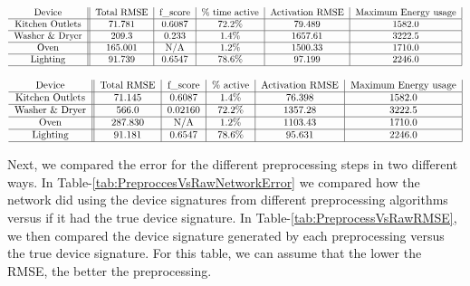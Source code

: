 \documentclass{article}
\begin{document}
\begin{table*}[t]
	\centering
	$$\begin{tabular}{c||c|c|c|c|c|}
	Device & Total RMSE & f\_score & \% time active& Activation RMSE & Maximum Energy usage \\
	\hline
	Kitchen Outlets & 71.781 & 0.6087 & 72.2\% & 79.489  & 1582.0  \\ %
	\hline
	Washer \& Dryer  & 209.3 & 0.233 & 1.4\% & 1657.61  & 3222.5 \\ %
	\hline
	Oven & 165.001 & N/A & 1.2\% & 1500.33  & 1710.0  \\ %
	\hline
	Lighting & 91.739 & 0.6547 & 78.6\% & 97.199  & 2246.0  \\ %
	\hline
	\end{tabular}$$
	
	 \label{tab:RawEstimate} 
\end{table*}

\begin{table*}[t]
	\centering
	$$\begin{tabular}{c||c|c|c|c|c|}
	Device & Total RMSE & f\_score & \% active & Activation RMSE & Maximum Energy usage\\
	\hline
	Kitchen Outlets & 71.145 & 0.6087 & 1.4\% & 76.398 & 1582.0  \\ %
	\hline
	Washer \& Dryer & 566.0  & 0.02160  & 72.2\% & 1357.28 & 3222.5  \\ %
	\hline
	Oven & 287.830 & N/A & 1.2\% & 1103.43 & 1710.0  \\ %
	\hline
	Lighting & 91.181 & 0.6547 & 78.6\% & 95.631  & 2246.0  \\ %
	\hline
	\end{tabular}$$
	
	 \label{tab:RawEstimateAfterGenerate} 
\end{table*}

Next, we compared the error for the different preprocessing steps in two different ways.
In Table-\ref{tab:PreproccesVsRawNetworkError} we compared how the network did using the device signatures from different preprocessing algorithms versus if it had the true device signature.
In Table-\ref{tab:PreprocessVsRawRMSE}, we then compared the device signature generated by each preprocessing versus the true device signature.
For this table, we can assume that the lower the RMSE, the better the preprocessing.
\end{document}
